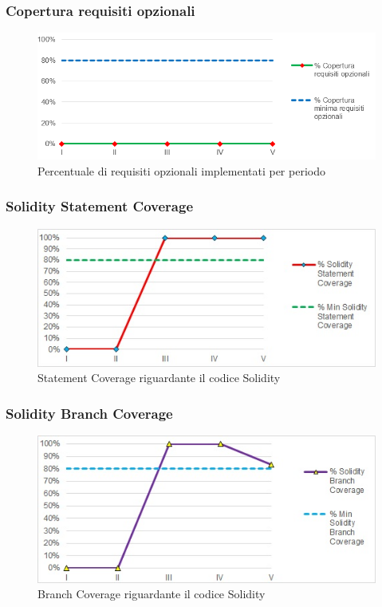 \subsubsection{Copertura requisiti opzionali}
\begin{figure}[H]
  \centering
  \includegraphics[scale=0.7]{immagini/cop_opzionali.png}
  \caption{Percentuale di requisiti opzionali implementati per periodo}
\end{figure}

\subsubsection{Solidity Statement Coverage}
\begin{figure}[H]
  \centering
  \includegraphics[scale=0.8]{immagini/solidity_statement.jpg}
  \caption{Statement Coverage riguardante il codice Solidity}
\end{figure}

\subsubsection{Solidity Branch Coverage}
\begin{figure}[H]
  \centering
  \includegraphics[scale=0.8]{immagini/solidity_branch.jpg}
  \caption{Branch Coverage riguardante il codice Solidity}
\end{figure}

